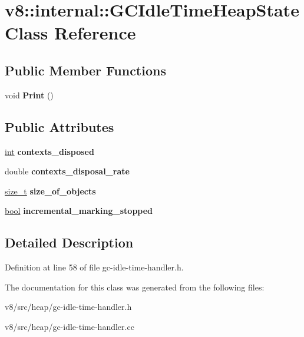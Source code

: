 \hypertarget{classv8_1_1internal_1_1GCIdleTimeHeapState}{}\section{v8\+:\+:internal\+:\+:G\+C\+Idle\+Time\+Heap\+State Class Reference}
\label{classv8_1_1internal_1_1GCIdleTimeHeapState}
\subsection*{Public Member Functions}
\begin{DoxyCompactItemize}
\item 
\mbox{\label{classv8_1_1internal_1_1GCIdleTimeHeapState_a80304be0fc23adca8ea87871a5dcd03b}} 
void {\bfseries Print} ()
\end{DoxyCompactItemize}
\subsection*{Public Attributes}
\begin{DoxyCompactItemize}
\item 
\mbox{\label{classv8_1_1internal_1_1GCIdleTimeHeapState_a0524bdd0064e202bc0f66888cdfbc86d}} 
\mbox{\hyperlink{classint}{int}} {\bfseries contexts\+\_\+disposed}
\item 
\mbox{\label{classv8_1_1internal_1_1GCIdleTimeHeapState_a41d8651b1cebaf14a73f8458207842d9}} 
double {\bfseries contexts\+\_\+disposal\+\_\+rate}
\item 
\mbox{\label{classv8_1_1internal_1_1GCIdleTimeHeapState_a66c1b77d6b17a21b6a1313072869ad57}} 
\mbox{\hyperlink{classsize__t}{size\+\_\+t}} {\bfseries size\+\_\+of\+\_\+objects}
\item 
\mbox{\label{classv8_1_1internal_1_1GCIdleTimeHeapState_a8ce1ab37ddce82d89432cb049ae119ab}} 
\mbox{\hyperlink{classbool}{bool}} {\bfseries incremental\+\_\+marking\+\_\+stopped}
\end{DoxyCompactItemize}


\subsection{Detailed Description}


Definition at line 58 of file gc-\/idle-\/time-\/handler.\+h.



The documentation for this class was generated from the following files\+:\begin{DoxyCompactItemize}
\item 
v8/src/heap/gc-\/idle-\/time-\/handler.\+h\item 
v8/src/heap/gc-\/idle-\/time-\/handler.\+cc\end{DoxyCompactItemize}
